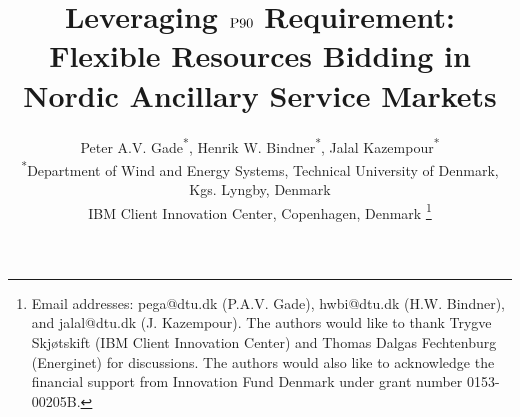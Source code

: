 \documentclass[conference]{IEEEtran}
\begin{document}

\title{Leveraging $\rm{P90}$ Requirement: Flexible Resources Bidding in Nordic Ancillary Service Markets}

\author{Peter A.V. Gade\textsuperscript{*}\textsuperscript{\textdagger}, Henrik W. Bindner\textsuperscript{*}, Jalal Kazempour\textsuperscript{*} \\
    \textsuperscript{*}Department of Wind and Energy Systems, Technical University of Denmark, Kgs. Lyngby, Denmark \\
    \textsuperscript{\textdagger}IBM Client Innovation Center, Copenhagen, Denmark
    \thanks{
        Email addresses: pega@dtu.dk (P.A.V. Gade), hwbi@dtu.dk (H.W. Bindner), and jalal@dtu.dk (J. Kazempour). The authors would like to thank Trygve Skjøtskift (IBM Client Innovation Center) and Thomas Dalgas Fechtenburg (Energinet) for discussions. The authors would also like to acknowledge the financial support from Innovation Fund Denmark under grant number 0153-00205B.}%
    \vspace{-3mm}
}




\maketitle

\end{document}

